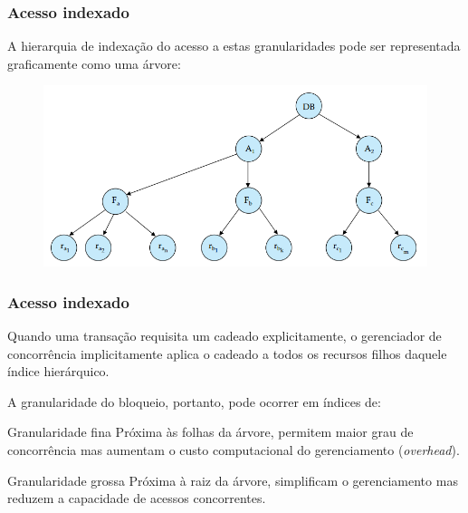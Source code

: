 \documentclass{beamer}
\begin{document}
\begin{frame} %
    \frametitle{Acesso indexado}    
    A hierarquia de indexação do acesso a estas granularidades pode ser representada graficamente como uma árvore:
    
    \medskip
    \begin{figure}
        \includegraphics[width=0.8\linewidth]{granularitytree.png}
    \end{figure}
    
\end{frame}

    
\begin{frame} %
    \frametitle{Acesso indexado}
    
    Quando uma transação requisita um cadeado explicitamente, o gerenciador de concorrência implicitamente aplica o cadeado a todos os recursos filhos daquele índice hierárquico.
    
    \medskip
    A granularidade do bloqueio, portanto, pode ocorrer em índices de:
    
    \medskip
    \begin{block}{Granularidade fina}
        Próxima às folhas da árvore, permitem maior grau de concorrência mas aumentam o custo computacional do gerenciamento (\emph{overhead}).
    \end{block}

    \medskip
    \begin{block}{Granularidade grossa}
        Próxima à raiz da árvore, simplificam o gerenciamento mas reduzem a capacidade de acessos concorrentes.
    \end{block}
\end{frame}
\end{document}
